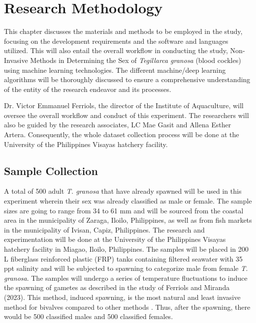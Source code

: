 \chapter{Research Methodology}
\label{sec:methodology}

This chapter discusses the materials and methods to be employed in the study, focusing on the development requirements and the software and languages utilized. This will also entail the overall workflow in conducting the study, Non-Invasive Methods in Determining the Sex of \textit{Tegillarca granosa} (blood cockles) using machine learning technologies. The different machine/deep learning algorithms will be thoroughly discussed to ensure a comprehensive understanding of the entity of the research endeavor and its processes. 

Dr. Victor Emmanuel Ferriols, the director of the Institute of Aquaculture, will oversee the overall workflow and conduct of this experiment. The researchers will also be guided by the research associates, LC Mae Gasit and Allena Esther Artera. Consequently, the whole dataset collection process will be done at the University of the Philippines Visayas hatchery facility. 



\section{Sample Collection}
\label{sec:samplecollect}
A total of 500 adult \textit{T. granosa} that have already spawned will be used in this experiment wherein their sex was already classified as male or female. The sample sizes are going to range from 34 to 61 mm and will be sourced from the coastal area in the municipality of Zaraga, Iloilo, Philippines, as well as from fish markets in the municipality of Ivisan, Capiz, Philippines. The research and experimentation will be done at the University of the Philippines Visayas hatchery facility in Miagao, Iloilo, Philippines. The samples will be placed in 200 L fiberglass reinforced plastic (FRP) tanks containing filtered seawater with 35 ppt salinity \cite{miranda2023} and will be subjected to spawning to categorize male from female \textit{T. granosa}. The samples will undergo a series of temperature fluctuations to induce the spawning of gametes as described in the study of Ferriols and Miranda (2023). This method, induced spawning, is the most natural and least invasive method for bivalves compared to other methods \cite{aji}. Thus, after the spawning, there would be 500 classified males and 500 classified females. 

